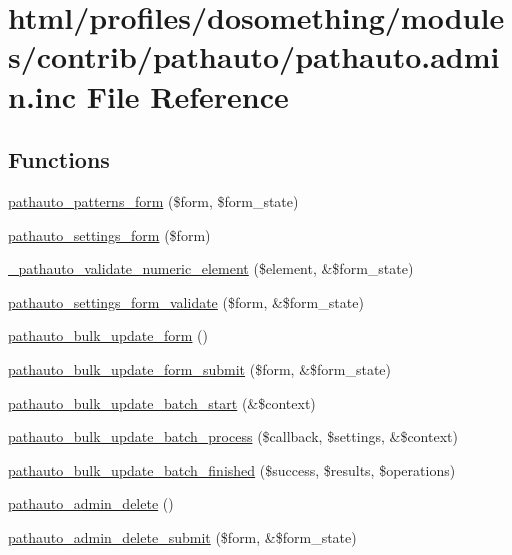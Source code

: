 \hypertarget{pathauto_8admin_8inc}{
\section{html/profiles/dosomething/modules/contrib/pathauto/pathauto.admin.inc File Reference}
\label{pathauto_8admin_8inc}
}
\subsection*{Functions}
\begin{DoxyCompactItemize}
\item 
\hyperlink{group__forms_ga2b3adb295ed84c13148b9c34ce0b3b73}{pathauto\_\-patterns\_\-form} (\$form, \$form\_\-state)
\item 
\hyperlink{group__forms_ga59b24f3617ff78cc8c9d8b3b4990b6e2}{pathauto\_\-settings\_\-form} (\$form)
\item 
\hyperlink{pathauto_8admin_8inc_adbd6f0b19fc224aa280c09e13ec53f9d}{\_\-pathauto\_\-validate\_\-numeric\_\-element} (\$element, \&\$form\_\-state)
\item 
\hyperlink{pathauto_8admin_8inc_ad27c29d292443ece46bfff41aee9c577}{pathauto\_\-settings\_\-form\_\-validate} (\$form, \&\$form\_\-state)
\item 
\hyperlink{group__forms_gadbfac53f8f52a25ad1d4b1a59bf8b907}{pathauto\_\-bulk\_\-update\_\-form} ()
\item 
\hyperlink{pathauto_8admin_8inc_a34661ac29b8c6d623ed9437ad194cfa4}{pathauto\_\-bulk\_\-update\_\-form\_\-submit} (\$form, \&\$form\_\-state)
\item 
\hyperlink{pathauto_8admin_8inc_a7d546d06b26c9c05c3d69e74b729afc2}{pathauto\_\-bulk\_\-update\_\-batch\_\-start} (\&\$context)
\item 
\hyperlink{pathauto_8admin_8inc_a491859249088d2bd407d711cefc3f0aa}{pathauto\_\-bulk\_\-update\_\-batch\_\-process} (\$callback, \$settings, \&\$context)
\item 
\hyperlink{pathauto_8admin_8inc_aa4e5f7dbb4b2173c5851759c4c4a6ac0}{pathauto\_\-bulk\_\-update\_\-batch\_\-finished} (\$success, \$results, \$operations)
\item 
\hyperlink{pathauto_8admin_8inc_a5ab614f256c8e356b59a402461ad0d90}{pathauto\_\-admin\_\-delete} ()
\item 
\hyperlink{pathauto_8admin_8inc_a604d88306854d9908e302ead4896f77e}{pathauto\_\-admin\_\-delete\_\-submit} (\$form, \&\$form\_\-state)
\end{DoxyCompactItemize}


